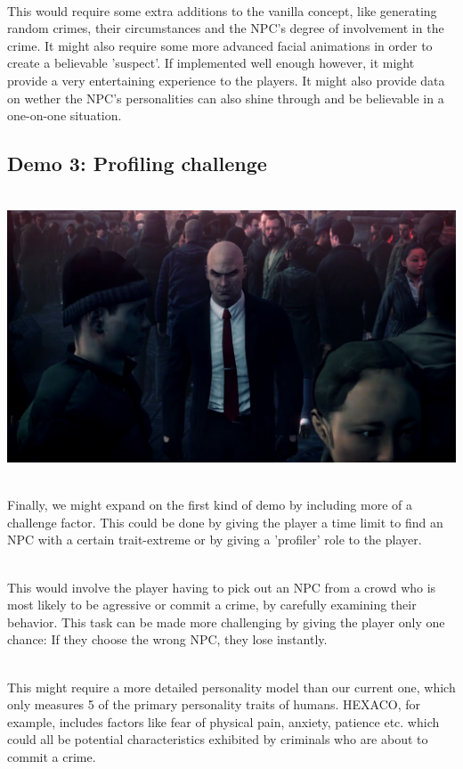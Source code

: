 \documentclass[11pt]{article} %
\begin{document}
~\\
This would require some extra additions to the vanilla concept, like generating random crimes, their circumstances and the NPC's degree of involvement in the crime. It might also require some more advanced facial animations in order to create a believable 'suspect'. If implemented well enough however, it might provide a very entertaining experience to the players. It might also provide data on wether the NPC's personalities can also shine through and be believable in a one-on-one situation.

\newpage
\subsection{Demo 3: Profiling challenge}

~\\
\includegraphics[scale=0.3]{Hitman}

~\\
Finally, we might expand on the first kind of demo by including more of a challenge factor. This could be done by giving the player a time limit to find an NPC with a certain trait-extreme or by giving a 'profiler' role to the player. 

~\\
This would involve the player having to pick out an NPC from a crowd who is most likely to be agressive or commit a crime, by carefully examining their behavior. This task can be made more challenging by giving the player only one chance: If they choose the wrong NPC, they lose instantly. 

~\\
This might require a more detailed personality model than our current one, which only measures 5 of the primary personality traits of humans. HEXACO, for example, includes factors like fear of physical pain, anxiety, patience etc. which could all be potential characteristics exhibited by criminals who are about to commit a crime.
\end{document}
